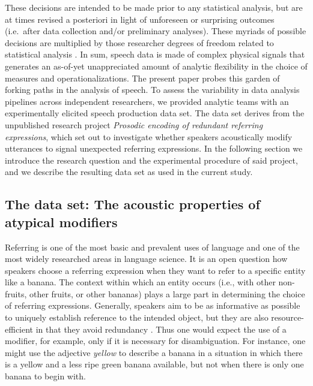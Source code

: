 \documentclass[Review,times,sageh]{sagej}
\begin{document}
These decisions are intended to be made prior to any statistical analysis, but are at times revised a posteriori in light of unforeseen or surprising outcomes (i.e.~after data collection and/or preliminary analyses).
These myriads of possible decisions are multiplied by those researcher degrees of freedom related to statistical analysis \citep[e.g.][]{wicherts2016}.
In sum, speech data is made of complex physical signals that generates an as-of-yet unappreciated amount of analytic flexibility in the choice of measures and operationalizations.
The present paper probes this garden of forking paths in the analysis of speech.
To assess the variability in data analysis pipelines across independent researchers, we provided analytic teams with an experimentally elicited speech production data set.
The data set derives from the unpublished research project \emph{Prosodic encoding of redundant referring expressions}, which set out to investigate whether speakers acoustically modify utterances to signal unexpected referring expressions.
In the following section we introduce the research question and the experimental procedure of said project, and we describe the resulting data set as used in the current study.

\hypertarget{s:dataset}{%
\subsection{The data set: The acoustic properties of atypical modifiers}\label{s:dataset}}

Referring is one of the most basic and prevalent uses of language and one of the most widely researched areas in language science.
It is an open question how speakers choose a referring expression when they want to refer to a specific entity like a banana.
The context within which an entity occurs (i.e., with other non-fruits, other fruits, or other bananas) plays a large part in determining the choice of referring expressions.
Generally, speakers aim to be as informative as possible to uniquely establish reference to the intended object, but they are also resource-efficient in that they avoid redundancy \citep{grice1975logic}.
Thus one would expect the use of a modifier, for example, only if it is necessary for disambiguation.
For instance, one might use the adjective \emph{yellow} to describe a banana in a situation in which there is a yellow and a less ripe green banana available, but not when there is only one banana to begin with.
\end{document}
